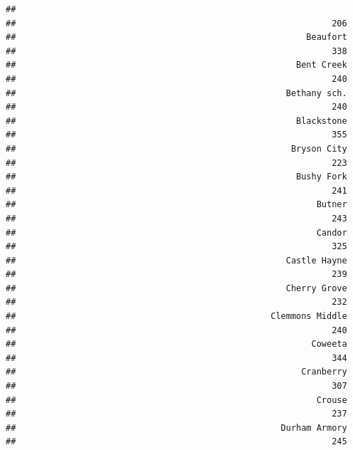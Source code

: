 \documentclass[12pt,]{article}
\newenvironment{Shaded}{\begin{snugshade}}{\end{snugshade}}
\newcommand{\KeywordTok}[1]{\textcolor[rgb]{0.13,0.29,0.53}{\textbf{#1}}}
\newcommand{\FloatTok}[1]{\textcolor[rgb]{0.00,0.00,0.81}{#1}}
\newcommand{\OperatorTok}[1]{\textcolor[rgb]{0.81,0.36,0.00}{\textbf{#1}}}
\newcommand{\NormalTok}[1]{#1}
\begin{document}
\begin{Shaded}
\end{Shaded}

\begin{verbatim}
##                                                                  
##                                                              206 
##                                                         Beaufort 
##                                                              338 
##                                                       Bent Creek 
##                                                              240 
##                                                     Bethany sch. 
##                                                              240 
##                                                       Blackstone 
##                                                              355 
##                                                      Bryson City 
##                                                              223 
##                                                       Bushy Fork 
##                                                              241 
##                                                           Butner 
##                                                              243 
##                                                           Candor 
##                                                              325 
##                                                     Castle Hayne 
##                                                              239 
##                                                     Cherry Grove 
##                                                              232 
##                                                  Clemmons Middle 
##                                                              240 
##                                                          Coweeta 
##                                                              344 
##                                                        Cranberry 
##                                                              307 
##                                                           Crouse 
##                                                              237 
##                                                    Durham Armory 
##                                                              245 

\end{verbatim}
\end{document}
